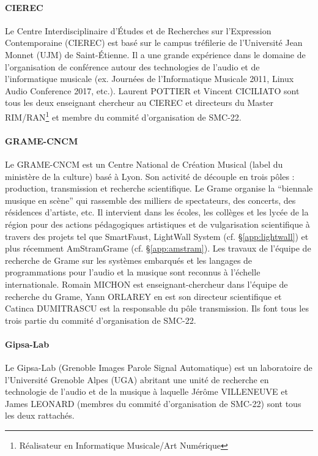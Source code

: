 \documentclass[fontsize=12pt]{scrartcl} %
\numberwithin{equation}{section} %
\numberwithin{table}{section} %
\begin{document}
\paragraph{\textbf{CIEREC}} Le Centre Interdisciplinaire d'Études et de Recherches sur l'Expression Contemporaine (CIEREC) est basé sur le campus tréfilerie de l'Université Jean Monnet (UJM) de Saint-Étienne. Il a une grande expérience dans le domaine de l'organisation de conférence autour des technologies de l'audio et de l'informatique musicale (ex. Journées de l'Informatique Musicale 2011, Linux Audio Conference 2017, etc.). Laurent POTTIER et Vincent CICILIATO sont tous les deux enseignant chercheur au CIEREC et directeurs du Master RIM/RAN\footnote{Réalisateur en Informatique Musicale/Art Numérique} et membre du commité d'organisation de SMC-22. 

\paragraph{\textbf{GRAME-CNCM}} Le GRAME-CNCM est un Centre National de Création Musical (label du ministère de la culture) basé à Lyon. Son activité de découple en trois pôles : production, transmission et recherche scientifique. Le Grame organise la ``biennale musique en scène'' qui rassemble des milliers de spectateurs, des concerts, des résidences d'artiste, etc. Il intervient dans les écoles, les collèges et les lycée de la région pour des actions pédagogiques artistiques et de vulgarisation scientifique à travers des projets tel que SmartFaust, LightWall System (cf. \S\ref{app:lightwall}) et plus récemment AmStramGrame (cf. \S\ref{app:amstram}). Les travaux de l'équipe de recherche de Grame sur les systèmes embarqués et les langages de programmations pour l'audio et la musique sont reconnus à l'échelle internationale. Romain MICHON est enseignant-chercheur dans l'équipe de recherche du Grame, Yann ORLAREY en est son directeur scientifique et Catinca DUMITRASCU est la responsable du pôle transmission. Ils font tous les trois partie du commité d'organisation de SMC-22.

\paragraph{\textbf{Gipsa-Lab}} Le Gipsa-Lab (Grenoble Images Parole Signal Automatique) est un laboratoire de l'Université Grenoble Alpes (UGA) abritant une unité de recherche en technologie de l'audio et de la musique à laquelle Jérôme VILLENEUVE et James LEONARD (membres du commité d'organisation de SMC-22) sont tous les deux rattachés.
\end{document}
